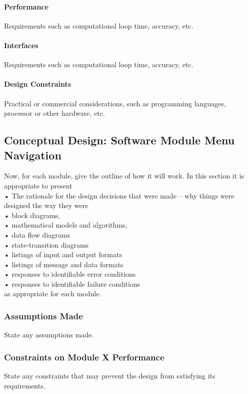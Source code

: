\documentclass[MTRX3700report.tex]{subfiles}
\begin{document}
\paragraph{Performance}
Requirements such as computational loop time, accuracy, etc.
\paragraph{Interfaces}
Requirements such as computational loop time, accuracy, etc.
\paragraph{Design Constraints}
Practical or commercial considerations, such as programming languages, processor or other hardware, etc.

\subsection{Conceptual Design: Software Module Menu Navigation}
Now, for each module, give the outline of how it will work. In this section it is appropriate to present \\
•	The rationale for the design decisions that were made – why things were designed the way they were\\
•	block diagrams,\\
•	mathematical models and algorithms,\\
•	data flow diagrams\\
•	state-transition diagrams\\
•	listings of input and output formats\\
•	listings of message and data formats\\
•	responses to identifiable error conditions\\
•	responses to identifiable failure conditions\\
as appropriate for each module.

\subsubsection{Assumptions Made}
State any assumptions made.
\subsubsection{Constraints on Module X Performance}
State any constraints that may prevent the design from satisfying its requirements.
\end{document}

